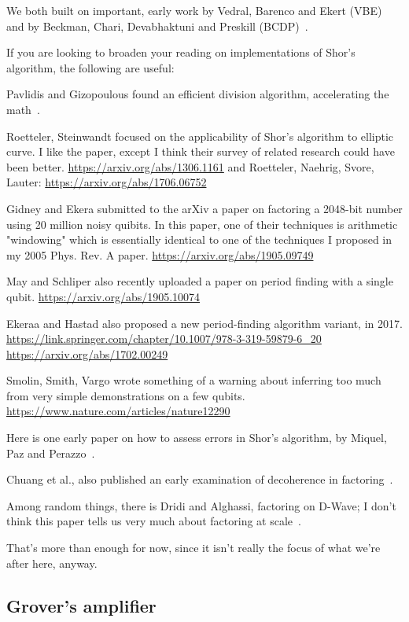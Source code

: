 We both built on important, early work by Vedral, Barenco and Ekert
(VBE)~\cite{vedral:quant-arith} and by Beckman, Chari, Devabhaktuni and Preskill (BCDP)~\cite{beckman96:eff-net-quant-fact}.

If you are looking to broaden your reading on implementations of
Shor’s algorithm, the following are useful:

Pavlidis and Gizopoulous found an efficient division algorithm,
accelerating the math~\cite{Pavlidis:2014:FQM:2638682.2638690}.

Roetteler, Steinwandt focused on the applicability of Shor's algorithm
to elliptic curve. I like the paper, except I think their survey of
related research could have been better.
\url{https://arxiv.org/abs/1306.1161}
and Roetteler, Naehrig, Svore, Lauter:
\url{https://arxiv.org/abs/1706.06752}

Gidney and Ekera submitted to the arXiv a paper on factoring a
2048-bit number using 20 million noisy quibits.  In this paper, one of
their techniques is arithmetic "windowing" which is essentially
identical to one of the techniques I proposed in my 2005 Phys. Rev. A
paper.  \url{https://arxiv.org/abs/1905.09749}

May and Schliper also recently uploaded a paper on period finding with
a single qubit.
\url{https://arxiv.org/abs/1905.10074}

Ekeraa and Hastad also proposed a new period-finding algorithm
variant, in 2017.
\url{https://link.springer.com/chapter/10.1007/978-3-319-59879-6_20}
\url{https://arxiv.org/abs/1702.00249}

Smolin, Smith, Vargo wrote something of a warning about inferring too
much from very simple demonstrations on a few qubits.
\url{https://www.nature.com/articles/nature12290}

Here is one early paper on how to assess errors in Shor’s algorithm,
by Miquel, Paz and Perazzo~\cite{miquel1996fdq}.

Chuang et al., also published an early examination of decoherence in
factoring~\cite{chuang95:_factoring-decoherence}.

Among random things, there is Dridi and Alghassi,
factoring on D-Wave; I don’t think this paper tells us very much about factoring at scale~\cite{dridi2017prime}.

That's more than enough for now, since it isn't really the focus of
what we're after here, anyway.

\subsection{Grover's amplifier}


